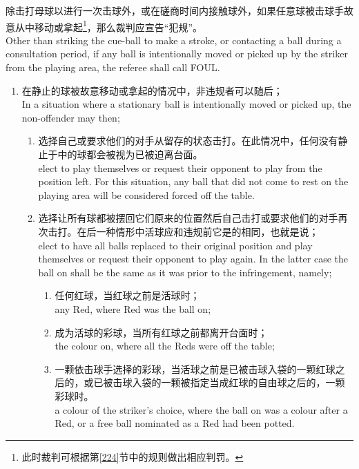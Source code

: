 \noindent 除击打母球以进行一次击球外，或在磋商时间内接触球外，如果任意球被击球手故意从\playingarea{}中移动或拿起\footnote{此时裁判可根据第\ref{224}节中的规则做出相应判罚。}，那么裁判应宣告“犯规”。\\
Other than striking the cue-ball to make a stroke, or contacting a ball during a consultation period, if any ball is intentionally moved or picked up by the striker from the playing area, the referee shall call FOUL.
\begin{enumerate}[label=(\alph*)]
    \item \label{22316a}在静止的球被故意移动或拿起的情况中，非违规者可以随后；\\
    In a situation where a stationary ball is intentionally 
    moved or picked up, the non-offender may then;
    \begin{enumerate}[label=(\roman*)]
        \item 选择自己或要求他们的对手从留存的状态击打。在此情况中，任何没有静止于\playingarea{}中的球都会被视为已被迫离台面。\\
        elect to play themselves or request their opponent to play from the position left. For this situation, any ball that did not come to rest on the playing area will be considered forced off the table.
        \item 选择让所有球都被摆回它们原来的位置然后自己击打或要求他们的对手再次击打。在后一种情形中活球应和违规前它是的相同，也就是说；\\
        elect to have all balls replaced to their original position and play themselves or request their opponent to play again. In the latter case the ball on shall be the same as it was prior to the infringement, namely;
        \begin{enumerate}[label=(\roman*)]
            \item 任何红球，当红球之前是活球时；\\
            any Red, where Red was the ball on;
            \item 成为活球的彩球，当所有红球之前都离开台面时；\\
            the colour on, where all the Reds were off the table;
            \item 一颗依击球手选择的彩球，当活球之前是已被击球入袋的一颗红球之后的，或已被击球入袋的一颗被指定当成红球的自由球之后的，一颗彩球时。\\
            a colour of the striker's choice, where the ball on was a colour after a Red, or a free ball nominated as a Red had been potted.
        \end{enumerate}

\end{enumerate}
\end{enumerate}
